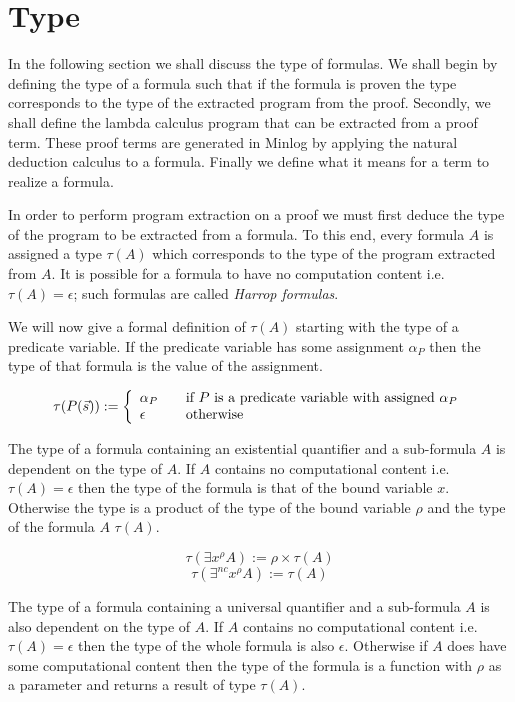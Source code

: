 \section{Type}

In the following section we shall discuss the type of formulas. We shall begin by defining the type of a formula such that if the formula is proven the type corresponds to the type of the extracted program from the proof. Secondly, we shall define the lambda calculus program that can be extracted from a proof term. These proof terms are generated in Minlog by applying the natural deduction calculus to a formula.  Finally we define what it means for a term to realize a formula.

In order to perform program extraction on a proof we must first deduce the
type of the program to be extracted from a formula. To this end, every formula $A$ is assigned a type $\tau(A)$ which corresponds to the type of the program extracted from $A$. It is possible for a formula to have no computation content i.e. $\tau(A) = \epsilon$; such formulas are called \emph{Harrop formulas}.


We will now give a formal definition of $\tau (A)$ starting with the type of a
predicate variable. If the predicate variable has some assignment $\alpha_P$ then the type of that
formula is the value of the assignment.


\[
\tau(P(\vec{s})) := \left\{ 
\begin{array}{l l}
  \alpha_P & \quad \text{if $P$ is a predicate variable with assigned $\alpha_P$}\\
 \epsilon & \quad \text{otherwise}\\
\end{array} \right.
\]

The type of a formula containing an existential quantifier and a sub-formula
$A$ is dependent on the type of $A$. If $A$ contains no computational content
i.e. $\tau(A) = \epsilon$ then the type of the formula is that of the bound
variable $x$. Otherwise the type is a product of the type of the bound
variable $\rho$ and the type of the formula $A$ $\tau (A)$.

\[
\tau(\exists x^{\rho} A) :=  \rho \times \tau (A)
\]
\[
\tau(\exists^{nc} x^{\rho} A) := 
 \tau (A) 
\]

The type of a formula containing a universal quantifier and a sub-formula $A$
is also dependent on the type of $A$. If $A$ contains no computational content
i.e. $\tau (A) = \epsilon$ then the type of the whole formula is also
$\epsilon$. Otherwise if $A$ does have some computational content then the type
of the formula is a function with $\rho$ as a parameter and returns a result
of type $\tau (A)$.


